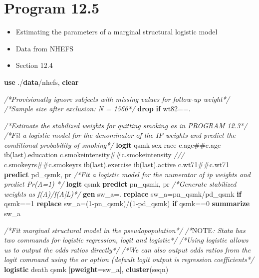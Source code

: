 \documentclass[
  10pt,
]{book}
\newenvironment{Shaded}{\begin{snugshade}}{\end{snugshade}}
\newcommand{\AlertTok}[1]{\textcolor[rgb]{0.94,0.16,0.16}{#1}}
\newcommand{\CommentTok}[1]{\textcolor[rgb]{0.56,0.35,0.01}{\textit{#1}}}
\newcommand{\FunctionTok}[1]{\textcolor[rgb]{0.00,0.00,0.00}{#1}}
\newcommand{\KeywordTok}[1]{\textcolor[rgb]{0.13,0.29,0.53}{\textbf{#1}}}
\newcommand{\NormalTok}[1]{#1}
\providecommand{\tightlist}{%
  \setlength{\itemsep}{0pt}\setlength{\parskip}{0pt}}
\begin{document}
\hypertarget{program-12.5-1}{%
\section{Program 12.5}\label{program-12.5-1}}

\begin{itemize}
\tightlist
\item
  Estimating the parameters of a marginal structural logistic model
\item
  Data from NHEFS
\item
  Section 12.4
\end{itemize}

\begin{Shaded}
\begin{Highlighting}[]
\KeywordTok{use}\NormalTok{ ./}\KeywordTok{data}\NormalTok{/nhefs, }\KeywordTok{clear}

\CommentTok{/*Provisionally ignore subjects with missing values for follow{-}up weight*/}
\CommentTok{/*Sample size after exclusion: N = 1566*/}
\KeywordTok{drop} \KeywordTok{if}\NormalTok{ wt82==.}

\CommentTok{/*Estimate the stabilized weights for quitting smoking as in PROGRAM 12.3*/}
\CommentTok{/*Fit a logistic model for the denominator of the IP weights and predict the conditional probability of smoking*/} 
\KeywordTok{logit}\NormalTok{ qsmk sex race c.age\#\#c.age ib(}\FunctionTok{last}\NormalTok{).education c.smokeintensity\#\#c.smokeintensity }\CommentTok{///}
\NormalTok{c.smokeyrs\#\#c.smokeyrs ib(}\FunctionTok{last}\NormalTok{).exercise ib(}\FunctionTok{last}\NormalTok{).active c.wt71\#\#c.wt71  }
\KeywordTok{predict}\NormalTok{ pd\_qsmk, pr}
\CommentTok{/*Fit a logistic model for the numerator of ip weights and predict Pr(A=1) */} 
\KeywordTok{logit}\NormalTok{ qsmk }
\KeywordTok{predict}\NormalTok{ pn\_qsmk, pr}
\CommentTok{/*Generate stabilized weights as f(A)/f(A|L)*/}
\KeywordTok{gen}\NormalTok{ sw\_a=.}
\KeywordTok{replace}\NormalTok{ sw\_a=pn\_qsmk/pd\_qsmk }\KeywordTok{if}\NormalTok{ qsmk==1}
\KeywordTok{replace}\NormalTok{ sw\_a=(1{-}pn\_qsmk)/(1{-}pd\_qsmk) }\KeywordTok{if}\NormalTok{ qsmk==0}
\KeywordTok{summarize}\NormalTok{ sw\_a}

\CommentTok{/*Fit marginal structural model in the pseudopopulation*/}
\CommentTok{/*}\AlertTok{NOTE}\CommentTok{: Stata has two commands for logistic regression, logit and logistic*/}
\CommentTok{/*Using logistic allows us to output the odds ratios directly*/}
\CommentTok{/*We can also output odds ratios from the logit command using the or option (default logit output is regression coefficients*/}
\KeywordTok{logistic}\NormalTok{ death qsmk [}\KeywordTok{pweight}\NormalTok{=sw\_a], }\KeywordTok{cluster}\NormalTok{(seqn) }
\end{Highlighting}
\end{Shaded}
\end{document}
